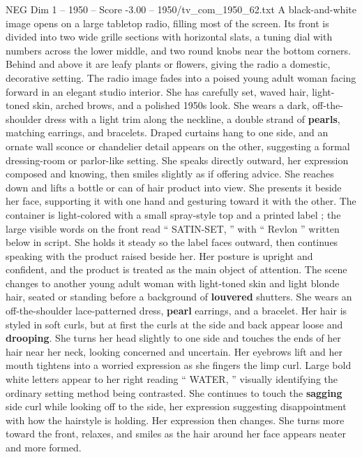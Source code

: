\begin{textsample}{NEG Dim 1 – 1950 – Score -3.00 – 1950/tv\_com\_1950\_62.txt}  \label{ex:f1_neg_009}
A black-and-white image opens on a large tabletop radio, filling most of the screen.
Its front is divided into two wide grille sections with horizontal slats, a tuning dial with numbers across the lower middle, and two round knobs near the bottom corners.
Behind and above it are leafy plants or flowers, giving the radio a domestic, decorative setting.
The radio image fades into a poised young adult woman facing forward in an elegant studio interior.
She has carefully set, waved hair, light-toned skin, arched brows, and a polished 1950s look.
She wears a dark, off-the-shoulder dress with a light trim along the neckline, a double strand of \textbf{pearls}, matching earrings, and bracelets.
Draped curtains hang to one side, and an ornate wall sconce or chandelier detail appears on the other, suggesting a formal dressing-room or parlor-like setting.
She speaks directly outward, her expression composed and knowing, then smiles slightly as if offering advice.
She reaches down and lifts a bottle or can of hair product into view.
She presents it beside her face, supporting it with one hand and gesturing toward it with the other.
The container is light-colored with a small spray-style top and a printed label ; the large visible words on the front read “ SATIN-SET, ” with “ Revlon ” written below in script.
She holds it steady so the label faces outward, then continues speaking with the product raised beside her.
Her posture is upright and confident, and the product is treated as the main object of attention.
The scene changes to another young adult woman with light-toned skin and light blonde hair, seated or standing before a background of \textbf{louvered} shutters.
She wears an off-the-shoulder lace-patterned dress, \textbf{pearl} earrings, and a bracelet.
Her hair is styled in soft curls, but at first the curls at the side and back appear loose and \textbf{drooping}.
She turns her head slightly to one side and touches the ends of her hair near her neck, looking concerned and uncertain.
Her eyebrows lift and her mouth tightens into a worried expression as she fingers the limp curl.
Large bold white letters appear to her right reading “ WATER, ” visually identifying the ordinary setting method being contrasted.
She continues to touch the \textbf{sagging} side curl while looking off to the side, her expression suggesting disappointment with how the hairstyle is holding.
Her expression then changes.
She turns more toward the front, relaxes, and smiles as the hair around her face appears neater and more formed.

\end{textsample}
